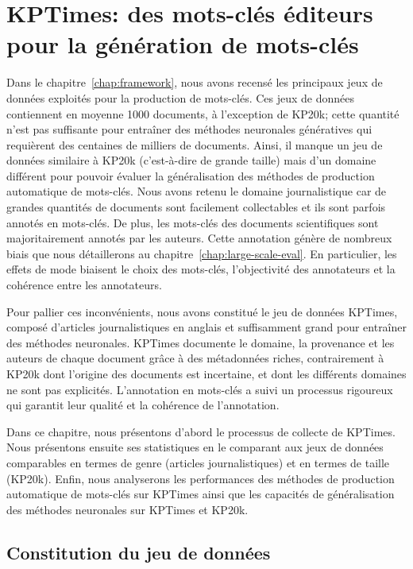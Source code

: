 \chapter{KPTimes: des mots-clés éditeurs pour la génération de mots-clés}\label{chap:kptimes}

Dans le chapitre~\ref{chap:framework}, nous avons recensé les principaux jeux de données exploités pour la production de mots-clés.
Ces jeux de données contiennent en moyenne \num{1000} documents, à l'exception de KP20k; cette quantité n'est pas suffisante pour entraîner des méthodes neuronales génératives qui requièrent des centaines de milliers de documents. 
Ainsi, il manque un jeu de données similaire à KP20k (c'est-à-dire de grande taille) mais d'un domaine différent pour pouvoir évaluer la généralisation des méthodes de production automatique de mots-clés.
Nous avons retenu le domaine journalistique car de grandes quantités de documents sont facilement collectables et ils sont parfois annotés en mots-clés.
De plus, les mots-clés des documents scientifiques sont majoritairement annotés par les auteurs.
Cette annotation génère de nombreux biais que nous détaillerons au chapitre~\ref{chap:large-scale-eval}. En particulier, les effets de mode biaisent le choix des mots-clés, l'objectivité des annotateurs et la cohérence entre les annotateurs.

Pour pallier ces inconvénients, nous avons constitué le jeu de données KPTimes, composé d'articles journalistiques en anglais et suffisamment grand pour entraîner des méthodes neuronales. KPTimes documente le domaine, la provenance et les auteurs de chaque document grâce à des métadonnées riches, contrairement à KP20k dont l'origine des documents est incertaine, et dont les différents domaines ne sont pas explicités. L'annotation en mots-clés a suivi un processus rigoureux qui garantit leur qualité et la cohérence de l'annotation. 

Dans ce chapitre, nous présentons d'abord le processus de collecte de KPTimes. Nous présentons ensuite ses statistiques en le comparant aux jeux de données comparables en termes de genre (articles journalistiques) et en termes de taille (KP20k). Enfin, nous analyserons les performances des méthodes de production automatique de mots-clés sur KPTimes ainsi que les capacités de généralisation des méthodes neuronales sur KPTimes et KP20k.

\section{Constitution du jeu de données}

